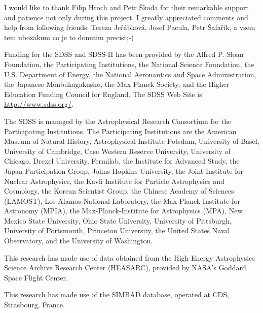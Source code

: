 

\begin{acknowledgements}      %


  I would like to thank Filip Hroch and Petr Škoda for their
  remarkable support and patience not only during this project. I
  greatly appreciated comments and help from following friends: Tereza
  Jeřábková, Josef Pacula, Petr Šafařík, a vsem tem ubozakum co je to
  donutim precist;-) 


  \bigskip 
  Funding for the SDSS and SDSS-II has been provided by the
  Alfred P. Sloan Foundation, the Participating Institutions, the
  National Science Foundation, the U.S. Department of Energy, the
  National Aeronautics and Space Administration, the Japanese
  Monbukagakusho, the Max Planck Society, and the Higher Education
  Funding Council for England. The SDSS Web Site is
  \url{http://www.sdss.org/}.

  The SDSS is managed by the Astrophysical Research Consortium for the
  Participating Institutions. The Participating Institutions are the
  American Museum of Natural History, Astrophysical Institute Potsdam,
  University of Basel, University of Cambridge, Case Western Reserve
  University, University of Chicago, Drexel University, Fermilab, the
  Institute for Advanced Study, the Japan Participation Group, Johns
  Hopkins University, the Joint Institute for Nuclear Astrophysics,
  the Kavli Institute for Particle Astrophysics and Cosmology, the
  Korean Scientist Group, the Chinese Academy of Sciences (LAMOST),
  Los Alamos National Laboratory, the Max-Planck-Institute for
  Astronomy (MPIA), the Max-Planck-Institute for Astrophysics (MPA),
  New Mexico State University, Ohio State University, University of
  Pittsburgh, University of Portsmouth, Princeton University, the
  United States Naval Observatory, and the University of Washington.
  \bigskip

   This research has made use of data obtained from the High Energy
  Astrophysics Science Archive Research Center (HEASARC), provided by
  NASA's Goddard Space Flight Center.

  \bigskip

  This research has made use of the SIMBAD database, operated at CDS,
  Strasbourg, France.



\end{acknowledgements}


